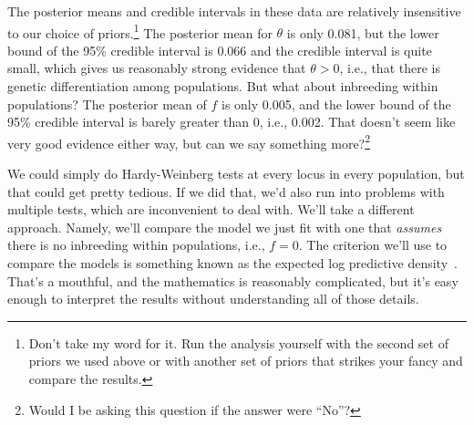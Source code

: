The posterior means and credible intervals in these data are
relatively insensitive to our choice of priors.\footnote{Don't take my
  word for it. Run the analysis yourself with the second set of priors
  we used above or with another set of priors that strikes your fancy
  and compare the results.} The posterior mean for $\theta$ is only
0.081, but the lower bound of the 95\% credible interval is 0.066 and
the credible interval is quite small, which gives us reasonably strong
evidence that $\theta > 0$, i.e., that there is genetic
differentiation among populations. But what about inbreeding within
populations? The posterior mean of $f$ is only 0.005, and the lower
bound of the 95\% credible interval is barely greater than 0, i.e.,
0.002. That doesn't seem like very good evidence either way, but can
we say something more?\footnote{Would I be asking this question if the
  answer were ``No''?}

We could simply do Hardy-Weinberg tests at every locus in every
population, but that could get pretty tedious. If we did that, we'd
also run into problems with multiple tests, which are inconvenient to
deal with. We'll take a different approach. Namely, we'll compare the
model we just fit with one that {\it assumes\/} there is no inbreeding
within populations, i.e., $f = 0$. The criterion we'll use to compare
the models is something known as the expected log predictive
density~\cite{Vehtari-etal-2017}. That's a mouthful, and the
mathematics is reasonably complicated, but it's easy enough to
interpret the results without understanding all of those details.

